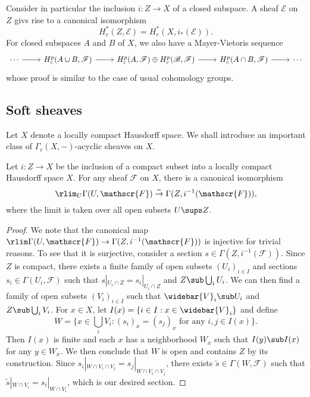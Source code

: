 Consider in particular the inclusion $i:Z\to X$ of a closed subspace. A sheaf $\mathscr{E}$ on $Z$ givs rise to a canonical isomorphism
\[H^*_c(Z,\mathscr{E})=H^*_c(X,i_*(\mathscr{E})).\]
For closed subspaces $A$ and $B$ of $X$, we also have a Mayer-Vietoris sequence
\[\begin{tikzcd}
\cdots\ar[r]&H^p_c(A\cup B,\mathscr{F})\ar[r]&H^p_c(A,\mathscr{F})\oplus H^p_c(\mathscr{B},\mathscr{F})\ar[r]&H^p_c(A\cap B,\mathscr{F})\ar[r]&\cdots
\end{tikzcd}\]
whose proof is similar to the case of usual cohomology groups.

\subsection{Soft sheaves}
Let $X$ denote a locally compact Hausdorff space. We shall introduce an important class of $\Gamma_c(X,-)$-acyclic sheaves on $X$.

\begin{proposition}\label{sheaf on LHS compact subset restriction isomorphism}
Let $i:Z\to X$ be the inclusion of a compact subset into a locally compact Hausdorff space $X$. For any sheaf $\mathscr{F}$ on $X$, there is a canonical isomorphism
\[\rlim_{U}\Gamma(U,\mathscr{F})\stackrel{\sim}{\to} \Gamma(Z,i^{-1}(\mathscr{F})),\]
where the limit is taken over all open subsets $U\sups Z$.
\end{proposition}
\begin{proof}
We note that the canonical map $\rlim\Gamma(U,\mathscr{F})\to\Gamma(Z,i^{-1}(\mathscr{F}))$ is injective for trivial reasons. To see that it is surjective, consider a section $s\in\Gamma(Z,i^{-1}(\mathscr{F}))$. Since $Z$ is compact, there exists a finite family of open subsets $(U_i)_{i\in I}$ and sections $s_i\in\Gamma(U_i,\mathscr{F})$ such that $s|_{U_i\cap Z}=s_i|_{U_i\cap Z}$ and $Z\sub\bigcup_iU_i$. We can then find a family of open subsets $(V_i)_{i\in I}$ such that $\widebar{V}_i\sub U_i$ and $Z\sub\bigcup_iV_i$. For $x\in X$, let $I(x)=\{i\in I:x\in\widebar{V}_i\}$ and define
\[W=\{x\in\bigcup_iV_i:\text{$(s_i)_x=(s_j)_x$ for any $i,j\in I(x)$}\}.\]
Then $I(x)$ is finite and each $x$ has a neighborhood $W_x$ such that $I(y)\sub I(x)$ for any $y\in W_x$. We then conclude that $W$ is open and contains $Z$ by its construction. Since $s_i|_{W\cap V_i\cap V_j}=s_j|_{W\cap V_i\cap V_j}$, there exists $\tilde{s}\in\Gamma(W,\mathscr{F})$ such that $\tilde{s}|_{W\cap V_i}=s_i|_{W\cap V_i}$, which is our desired section.
\end{proof}

